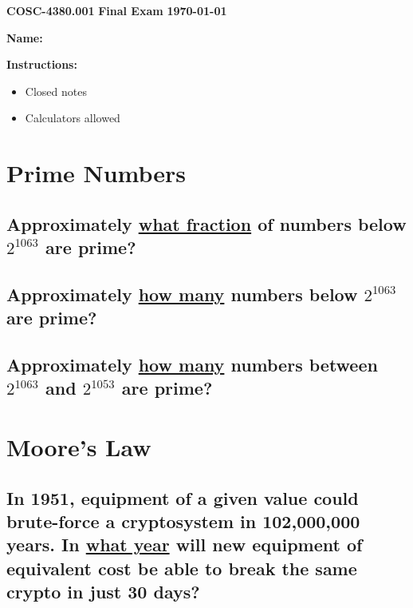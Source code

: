 \documentclass[12pt]{article}
\begin{document}
\noindent \Large \textbf{COSC-4380.001}  \hfill \textbf{Final Exam}  \hfill \textbf{\today}\\

\vspace{0cm}

\textbf{Name:}
\hrulefill

\vspace{0.2cm}
\Large
\textbf{Instructions:}
\begin{itemize}
    \item Closed notes
    \item Calculators allowed
\end{itemize}


\section{Prime Numbers}

\subsection{Approximately \underline{what fraction} of numbers below $2^{1063}$ are prime?}

\vspace{7cm}

\subsection{Approximately \underline{how many} numbers below $2^{1063}$ are prime?}

\newpage

\subsection{Approximately \underline{how many} numbers between $2^{1063}$ and $2^{1053}$ are prime?}

\vspace{8cm}

\section{Moore's Law}

\subsection{In 1951, equipment of a given value could brute-force a cryptosystem in 102,000,000 years.  In \underline{what year} will new equipment of equivalent cost be able to break the same crypto in just 30 days?}
\end{document}
